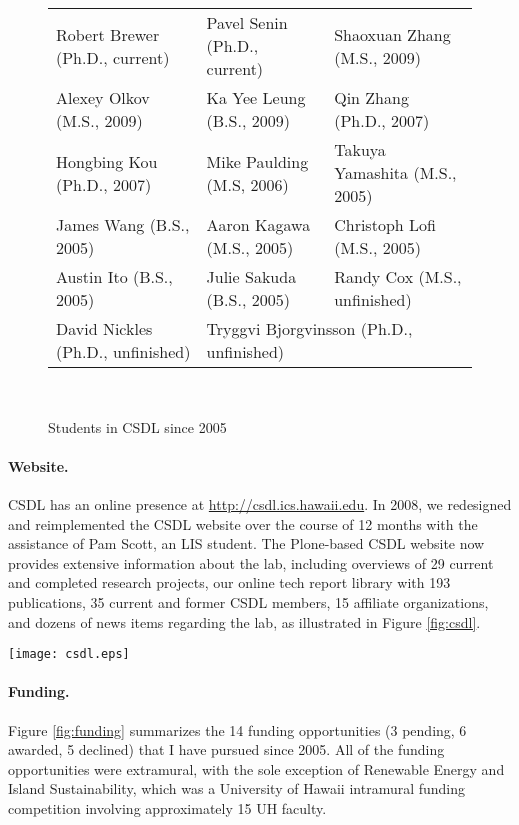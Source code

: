 \documentclass[11pt]{article}
\begin{document}
\begin{figure}[ht]
\small
\begin{tabular}{p{2in}p{2in}p{2in}} \hline
Robert Brewer (Ph.D., current) & Pavel Senin (Ph.D., current)  & Shaoxuan Zhang (M.S., 2009) \\
Alexey Olkov (M.S., 2009) & Ka Yee Leung (B.S., 2009) & Qin Zhang (Ph.D., 2007) \\
Hongbing Kou (Ph.D., 2007) & Mike Paulding (M.S, 2006)  & Takuya Yamashita (M.S., 2005) \\
James Wang (B.S., 2005) & Aaron Kagawa (M.S., 2005) & Christoph Lofi (M.S., 2005) \\
Austin Ito (B.S., 2005) & Julie Sakuda (B.S., 2005) & Randy Cox (M.S., unfinished) \\
David Nickles (Ph.D., unfinished) & \multicolumn{2}{l}{Tryggvi Bjorgvinsson (Ph.D., unfinished)}  \\ \hline
\end{tabular} \\ 
\normalsize
\caption{Students in CSDL since 2005}
\label{fig:students}
\end{figure}

\paragraph{Website.} CSDL has an online presence at
\url{http://csdl.ics.hawaii.edu}. In 2008, we redesigned and reimplemented 
the CSDL website over the course of 12 months with the
assistance of Pam Scott, an LIS student.  The Plone-based CSDL website 
now provides extensive information about the lab, including overviews of
29 current and completed research projects, our online tech
report library with 193 publications, 35 current and former CSDL
members, 15 affiliate organizations, and dozens of news items regarding the lab, as
illustrated in Figure \ref{fig:csdl}.

\begin{figure*}[th]
  \center
  \texttt{[image: csdl.eps]}
  \caption{The CSDL Home Page}
  \label{fig:csdl}
\end{figure*} 

\newpage
\paragraph{Funding.} Figure \ref{fig:funding} summarizes the 14 funding opportunities (3 pending, 6 awarded, 5 declined) that I have pursued since 2005. All of the funding opportunities were extramural, with the sole exception of Renewable Energy and Island Sustainability, which was a University of Hawaii intramural funding competition involving approximately 15 UH faculty. 
\end{document}
